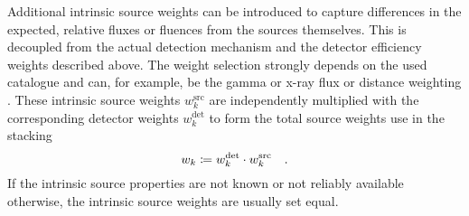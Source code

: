 Additional intrinsic source weights can be introduced to capture differences in the expected, relative fluxes or fluences from the sources themselves.
This is decoupled from the actual detection mechanism and the detector efficiency weights described above.
The weight selection strongly depends on the used catalogue and can, for example, be the gamma or x-ray flux or distance weighting .
These intrinsic source weights $w_k^\text{src}$ are independently multiplied with the corresponding detector weights $w_k^\text{det}$ to form the total source weights use in the stacking
\begin{equation}
  w_k \coloneqq w_k^\text{det} \cdot w_k^\text{src}
  \quad\text{.}
\end{equation}
If the intrinsic source properties are not known or not reliably available otherwise, the intrinsic source weights are usually set equal.

